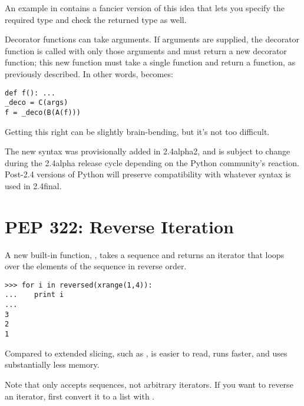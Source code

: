 \documentclass{howto}
\begin{document}
An example in  contains a fancier version of this idea that
lets you specify the required type and check the returned type as
well.

Decorator functions can take arguments.  If arguments are supplied,
the decorator function is called with only those arguments and must
return a new decorator function; this new function must take a single
function and return a function, as previously described.  In other
words,  becomes:

\begin{verbatim}
def f(): ...
_deco = C(args)
f = _deco(B(A(f)))
\end{verbatim}

Getting this right can be slightly brain-bending, but it's not too
difficult.

The new syntax was provisionally added in 2.4alpha2, and is subject to
change during the 2.4alpha release cycle depending on the Python
community's reaction.  Post-2.4 versions of Python will preserve
compatibility with whatever syntax is used in 2.4final.

\begin{seealso}
\end{seealso}

\section{PEP 322: Reverse Iteration}

A new built-in function, , takes a sequence
and returns an iterator that loops over the elements of the sequence 
in reverse order.  

\begin{verbatim}
>>> for i in reversed(xrange(1,4)):
...    print i
... 
3
2
1
\end{verbatim}

Compared to extended slicing, such as ,
 is easier to read, runs faster, and uses
substantially less memory.

Note that  only accepts sequences, not arbitrary
iterators.  If you want to reverse an iterator, first convert it to 
a list with .
\end{document}
